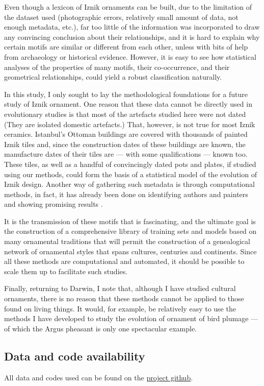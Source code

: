 \documentclass[11pt]{article}
\begin{document}
Even though a lexicon of Iznik ornaments can be built, due to the limitation of the dataset used (photographic errors, relatively small amount of data, not enough metadata, etc.), far too little of the information was incorporated to draw any convincing conclusion about their relationships, and it is hard to explain why certain motifs are similar or different from each other, unless with bits of help from archaeology or historical evidence. However, it is easy to see how statistical analyses of the properties of many motifs, their co-occurrence, and their geometrical relationships, could yield a robust classification naturally. \par
In this study, I only sought to lay the methodological foundations for a future study of Iznik ornament. One reason that these data cannot be directly used in evolutionary studies is that most of the artefacts studied here were not dated (They are isolated domestic artefacts.)  That, however, is not true for most Iznik ceramics. Istanbul's Ottoman buildings are covered with thousands of painted Iznik tiles and, since the construction dates of these buildings are known, the manufacture dates of their tiles are --- with some qualifications --- known too. These tiles, as well as a handful of convincingly dated pots and plates, if studied using our methods, could form the basis of a statistical model of the evolution of Iznik design. Another way of gathering such metadata is through computational methods, in fact, it has already been done on identifying authors and painters and showing promising results \parencite{qian2017deep, widjaja2003identifying}.\par
It is the transmission of these motifs that is fascinating, and the ultimate goal is the construction of a comprehensive library of training sets and models based on many ornamental traditions that will permit the construction of a genealogical network of ornamental styles that spans cultures, centuries and continents. Since all these methods are computational and automated, it should be possible to scale them up to facilitate such studies.\par
Finally, returning to Darwin, I note that, although I have studied cultural ornaments, there is no reason that these methods cannot be applied to those found on living things. It would, for example, be relatively easy to use the methods I have developed to study the evolution of ornament of bird plumage --- of which the Argus pheasant is only one spectacular example.\par
\subsection*{Data and code availability}
All data and codes used can be found on the \href{https://github.com/gregiee/CMEEcoursework/tree/master/ThesisProject}{project github}.
\end{document}
